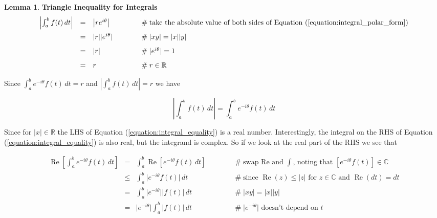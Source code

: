 \documentclass{article}
\theoremstyle{definition}
\newtheorem{lemma}{Lemma}[section]
\begin{document}
\begin{lemma} {\bf Triangle Inequality for Integrals}
\begin{equation*}
\begin{array}{llll}
\left | \int_{a}^{b} f(t) \, dt \right | 
&=& \left | re^{i\theta} \right |
	&\hspace{3em} \mathrel{\#} \text{take the absolute value of both sides of 
									 Equation (\ref{equation:integral_polar_form})} \\
[8pt]
&=& |r||e^{i\theta}|
	&\hspace{3em} \mathrel{\#} |xy| = |x||y| \\
[8pt]
&=& |r|
	&\hspace{3em} \mathrel{\#} |e^{i\theta}| = 1 \\
[8pt]
&=& r
	&\hspace{3em} \mathrel{\#} r \in \mathbb{R} \\
\end{array}
\end{equation*}

\bigskip
\noindent
Since $\int_{a}^{b} e^{-i\theta} f(t) \, dt  = r$ and 
$\left | \int_{a}^{b} f(t) \, dt \right | = r$ we have

\bigskip
\begin{equation}
\left | \int_{a}^{b} f(t) \, dt \right | = \int_{a}^{b} 
e^{-i\theta} f(t) \, dt 
\label{equation:integral_equality}
\end{equation}

\bigskip
\noindent
Since for $|x| \in \mathbb{R}$ the LHS of Equation (\ref{equation:integral_equality})
is a real number. Interestingly, the integral on the RHS of Equation (\ref{equation:integral_equality}) 
is also real, but the integrand is complex. So if we look at the real part of the RHS 
we see that

\begin{equation*}
\begin{array}{llll}
{\displaystyle \operatorname{Re} \left [ \int_{a}^{b} e^{-i\theta} f(t) \, dt \right ]} 
&=& {\displaystyle \int_{a}^{b} \operatorname{Re} \left [e^{-i\theta} f(t) \, dt \right ] }
	&\hspace{3em} \mathrel{\#} \text{swap Re and $\int$, noting that $\left [e^{-i\theta} f(t) \right ] \in \mathbb{C}$} \\
[10pt]
&\leq& {\displaystyle \int_{a}^{b} \big | e^{-i\theta} f(t) \big | \, dt}
	&\hspace{3em} \mathrel{\#} \text{since $\operatorname{Re}(z) \leq |z|$ for $z \in \mathbb{C}$ and $\operatorname{Re}(dt) = dt$} \\
[10pt]
&=& {\displaystyle \int_{a}^{b} \big | e^{-i\theta} \big | \left | f(t) \right | \, dt}
	&\hspace{3em} \mathrel{\#} |xy| = |x||y| \\
[10pt]
&=& {\displaystyle \big | e^{-i\theta} \big | \int_{a}^{b}  \left | f(t) \right | \, dt}
	&\hspace{3em} \mathrel{\#} \text{$\big | e^{-i\theta} \big |$ doesn't depend on $t$} \\
[10pt]


\end{array}
\end{equation*}
\end{lemma}
\end{document}
